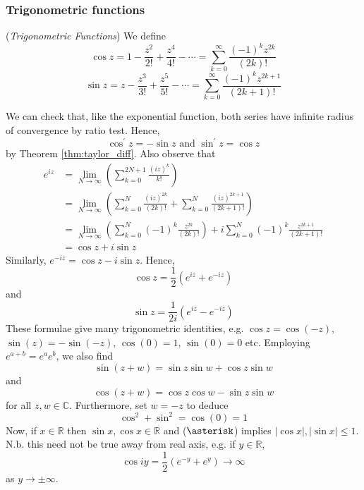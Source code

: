\documentclass[10pt, a4paper, twoside]{report}
\begin{document}
\subsubsection{Trigonometric functions}
\begin{definition}
    (\emph{Trigonometric Functions}) We define 
    \[\cos z=1-\frac{z^2}{2!}+\frac{z^4}{4!}-\cdots=\sum_{k=0}^{\infty}\frac{(-1)^kz^{2k}}{(2k)!}\]
    \[\sin z=z-\frac{z^3}{3!}+\frac{z^5}{5!}-\cdots=\sum_{k=0}^{\infty}\frac{(-1)^kz^{2k+1}}{(2k+1)!}\]
\end{definition}
We can check that, like the exponential function, both series have infinite radius of convergence by ratio test. Hence, 
\[\cos^\prime z=-\sin z\text{  and  }\sin^\prime z=\cos z\]
by Theorem \ref{thm:taylor_diff}.
Also observe that 
\begin{align*}
    e^{iz}&=\lim_{N\to\infty}\left(\sum_{k=0}^{2N+1}\frac{(iz)^k}{k!}\right) \\
    &=\lim_{N\to\infty}\left(\sum_{k=0}^N\frac{(iz)^{2k}}{(2k)!}+\sum_{k=0}^N\frac{(iz)^{2k+1}}{(2k+1)!}\right) \\
    &=\lim_{N\to\infty}\left(\sum_{k=0}^N(-1)^k\frac{z^{2k}}{(2k)!}\right)+i\sum_{k=0}^N(-1)^k\frac{z^{2k+1}}{(2k+1)!} \\
    &=\cos z+i\sin z
\end{align*}
Similarly, \(e^{-iz}=\cos z-i\sin z\). Hence,
\[\cos z=\frac 12(e^{iz}+e^{-iz})\]
and 
\[\sin z=\frac 1{2i}(e^{iz}-e^{-iz})\]
These formulae give many trigonometric identities, e.g. \(\cos z=\cos(-z)\), \(\sin(z)=-\sin(-z)\), \(\cos(0)=1\), \(\sin(0)=0\) etc. Employing \(e^{a+b}=e^{a}e^b\), we also find 
\[\sin(z+w)=\sin z\sin w+\cos z\sin w\]
and 
\[\cos(z+w)=\cos z\cos w-\sin z\sin w\]
for all \(z,w\in\mathbb{C}\). Furthermore, set \(w=-z\) to deduce 
\[\cos^2+\sin^2=\cos(0)=1\tag{\(\asterisk\)}\]
Now, if \(x\in\mathbb{R}\) then \(\sin x,\cos x\in\mathbb{R}\) and (\(\asterisk\)) implies \(|\cos x|,|\sin x|\leq 1\). N.b. this need not be true away from real axis, e.g. if \(y\in\mathbb{R}\),
\[\cos iy=\frac 12(e^{-y}+e^y)\to\infty\]
as \(y\to\pm\infty\).
\end{document}
